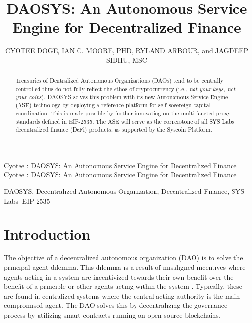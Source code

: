 \documentclass[journal,twocolumn,12pt]{ieeesyscoin}
\begin{document}
\linenumbers
\history{}

\title{\centering DAOSYS: An Autonomous Service Engine for Decentralized Finance}
\author{\centering  \uppercase{Cyotee Doge}, 
\uppercase{Ian C. Moore, PhD},
\uppercase{Ryland Arbour}, and
\uppercase{Jagdeep Sidhu, MSc}}

\address[1]{\centering DAO Advisor, Syscoin Platform (e-mail: cyotee@syscoin.org)}
\address[2]{\centering  Syscoin Researcher, Syscoin Platform (e-mail: imoore@syscoin.org)}
\address[3]{\centering  L2 Advisor, Syscoin Platform (e-mail: rylandarbour@syscoin.com)}
\address[4]{\centering Syscoin Lead Developer, (e-mail: sidhujag@syscoin.org)}
\tfootnote{}

\markboth
{Cyotee \headeretal: DAOSYS: An Autonomous Service Engine for Decentralized Finance}
{Cyotee \headeretal: DAOSYS: An Autonomous Service Engine for Decentralized Finance}

\corresp{}

\begin{abstract}
Treasuries of Dentralized Autonomous Organizations (DAOs) tend to be centrally controlled thus do not fully reflect the ethos of cryptocurrency (i.e., \textit{not your keys, not your coins}). DAOSYS solves this problem with its new Autonomous Service Engine (ASE) technology by deploying a reference platform for self-sovereign capital coordination. This is made possible by further innovating on the multi-faceted proxy standards defined in EIP-2535. The ASE will serve as the cornerstone of all SYS Labs decentralized finance (DeFi) products, as supported by the Syscoin Platform.
\end{abstract}

\begin{keywords}
DAOSYS, Decentralized Autonomous Organization, Decentralized Finance, SYS Labs, EIP-2535
\end{keywords}

\titlepgskip=-15pt

\maketitle

\section{Introduction}
\label{sec:introduction}

The objective of a decentralized autonomous organization (DAO) is to solve the principal-agent dilemma. This dilemma is a result of misaligned incentives where agents acting in a system are incentivized towards their own benefit over the benefit of a principle or other agents acting within the system \cite{San83}. Typically, these are found in centralized systems where the central acting authority is the main compromised agent. The DAO solves this by decentralizing the governance process by utilizing smart contracts running on open source blockchains.
\end{document}
